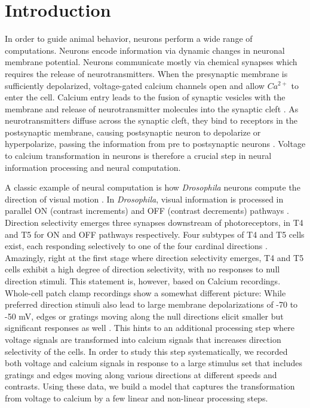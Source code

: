 \documentclass[9pt,lineno]{elife}
\begin{document}
\section{Introduction}
In order to guide animal behavior, neurons perform a wide range of computations. Neurons encode information via dynamic changes in neuronal membrane potential. Neurons communicate mostly via chemical synapses which requires the release of neurotransmitters. When the presynaptic membrane is sufficiently depolarized, voltage-gated calcium channels open and allow $Ca^{2+}$ to enter the cell. Calcium entry leads to the fusion of synaptic vesicles with the membrane and release of neurotransmitter molecules into the synaptic cleft \parencite{Chapman2002}.  As neurotransmitters diffuse across the synaptic cleft, they bind to receptors in the postsynaptic membrane, causing postsynaptic neuron to depolarize or hyperpolarize, passing the information from pre to postsynaptic neurons \parencite{Maio2008}. Voltage to calcium transformation in neurons is therefore a crucial step in neural information processing and neural computation. 

A classic example of neural computation is how \textit{Drosophila} neurons compute the direction of visual motion \parencite{Borst2020}. In \textit{Drosophila}, visual information is processed in parallel ON (contrast increments) and OFF (contrast decrements) pathways \parencite{Joesch2010, Eichner2011}. Direction selectivity emerges three synapses downstream of photoreceptors, in T4 and T5 for ON and OFF pathways respectively. Four subtypes of T4 and T5 cells exist, each responding selectively to one of the four cardinal directions \parencite{Maisak2013}. Amazingly, right at the first stage where direction selectivity emerges, T4 and T5 cells exhibit a high degree of direction selectivity, with no responses to null direction stimuli. This statement is, however, based on Calcium recordings. Whole-cell patch clamp recordings show a somewhat different picture: While preferred direction stimuli also lead to large membrane depolarizations of -70 to -50 mV, edges or gratings moving along the null directions elicit smaller but significant responses as well \parencite{Groschner2022}. This hints to an additional processing step where voltage signals are transformed into calcium signals that increases direction selectivity of the cells. In order to study this step systematically, we recorded both voltage and calcium signals in response to a large stimulus set that includes gratings and edges moving along various directions at different speeds and contrasts. Using these data, we build a model that captures the transformation from voltage to calcium by a few linear and non-linear processing steps.
\end{document}
